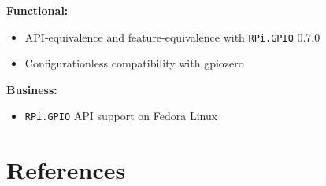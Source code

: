 \documentclass[12pt]{article}
\begin{document}
\noindent \textbf{Functional:}
\begin{itemize}
    \item API-equivalence and feature-equivalence with \texttt{RPi.GPIO} 0.7.0 \cite{rpigpio}
    \item Configurationless compatibility with gpiozero \cite{gpiozero}
\end{itemize}

\noindent \textbf{Business:}
\begin{itemize}
    \item \texttt{RPi.GPIO} API support on Fedora Linux
\end{itemize}


\section{References}



\end{document}
